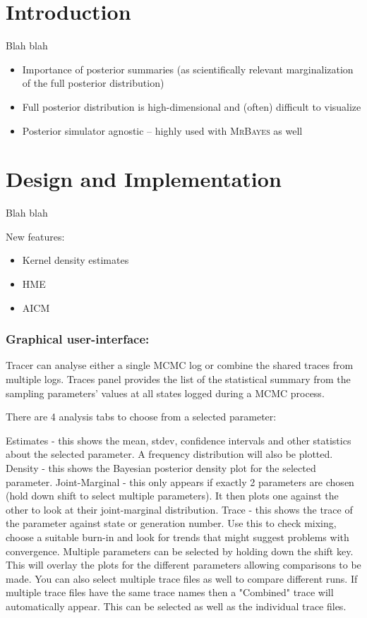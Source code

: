 \documentclass{bioinfo}
\begin{document}
\section*{Introduction}

Blah blah 

\begin{itemize}
\item Importance of posterior summaries (as scientifically relevant marginalization of the full posterior distribution)
\item Full posterior distribution is high-dimensional and (often) difficult to visualize
\item Posterior simulator agnostic -- highly used with \textsc{MrBayes} as well
\end{itemize}

\section*{Design and Implementation}

Blah blah 

New features:
\begin{itemize}
\item Kernel density estimates
\item HME
\item AICM
\end{itemize}

\subsubsection*{Graphical user-interface:}

Tracer can analyse either a single MCMC log or combine the shared traces from multiple logs. Traces panel provides the list of the statistical summary from the sampling parameters' values at all states logged during a MCMC process. 

There are 4 analysis tabs to choose from a selected parameter:

Estimates - this shows the mean, stdev, confidence intervals and other statistics about the selected parameter. A frequency distribution will also be plotted.
Density - this shows the Bayesian posterior density plot for the selected parameter.
Joint-Marginal - this only appears if exactly 2 parameters are chosen (hold down shift to select multiple parameters). It then plots one against the other to look at their joint-marginal distribution.
Trace - this shows the trace of the parameter against state or generation number. Use this to check mixing, choose a suitable burn-in and look for trends that might suggest problems with convergence.
Multiple parameters can be selected by holding down the shift key. This will overlay the plots for the different parameters allowing comparisons to be made. You can also select multiple trace files as well to compare different runs. If multiple trace files have the same trace names then a "Combined" trace will automatically appear. This can be selected as well as the individual trace files.
\end{document}
